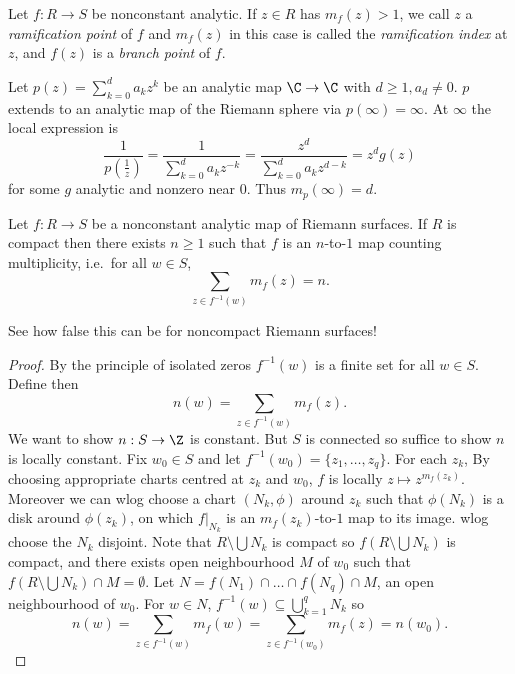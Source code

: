 \documentclass[a4paper]{article}
\begin{document}
\begin{definition}
  Let \(f: R \to S\) be nonconstant analytic. If \(z \in R\) has \(m_f(z) > 1\), we call \(z\) a \emph{ramification point} of \(f\) and \(m_f(z)\) in this case is called the \emph{ramification index} at \(z\), and \(f(z)\) is a \emph{branch point} of \(f\).
\end{definition}

\begin{eg}
  Let \(p(z) = \sum_{k = 0}^d a_kz^k\) be an analytic map \(\C \to \C\) with \(d \geq 1, a_d \neq 0\). \(p\) extends to an analytic map of the Riemann sphere via \(p(\infty) = \infty\). At \(\infty\) the local expression is
  \[
    \frac{1}{p(\frac{1}{z})} = \frac{1}{\sum_{k = 0}^d a_k z^{-k}} = \frac{z^d}{\sum_{k = 0}^d a_k z^{d - k}} = z^d g(z)
  \]
  for some \(g\) analytic and nonzero near \(0\). Thus \(m_p(\infty) = d\).
\end{eg}

\begin{theorem}
  Let \(f: R \to S\) be a nonconstant analytic map of Riemann surfaces. If \(R\) is compact then there exists \(n \geq 1\) such that \(f\) is an \(n\)-to-\(1\) map counting multiplicity, i.e.\ for all \(w \in S\),
  \[
    \sum_{z \in f^{-1}(w)} m_f(z) = n.
  \]
\end{theorem}

See how false this can be for noncompact Riemann surfaces!

\begin{proof}
  By the principle of isolated zeros \(f^{-1}(w)\) is a finite set for all \(w \in S\). Define then
  \[
    n(w) = \sum_{z \in f^{-1}(w)} m_f(z).
  \]
  We want to show \(n: S \to \Z\) is constant. But \(S\) is connected so suffice to show \(n\) is locally constant. Fix \(w_0 \in S\) and let \(f^{-1}(w_0) = \{z_1, \dots, z_q\}\). For each \(z_k\), By choosing appropriate charts centred at \(z_k\) and \(w_0\), \(f\) is locally \(z \mapsto z^{m_f(z_k)}\). Moreover we can wlog choose a chart \((N_k, \phi)\) around \(z_k\) such that \(\phi(N_k)\) is a disk around \(\phi(z_k)\), on which \(f|_{N_k}\) is an \(m_f(z_k)\)-to-\(1\) map to its image. wlog choose the \(N_k\) disjoint. Note that \(R \setminus \bigcup N_k\) is compact so \(f(R \setminus \bigcup N_k)\) is compact, and there exists open neighbourhood \(M\) of \(w_0\) such that \(f(R \setminus \bigcup N_k) \cap M = \emptyset\). Let \(N = f(N_1) \cap \dots \cap f(N_q) \cap M\), an open neighbourhood of \(w_0\). For \(w \in N\), \(f^{-1}(w) \subseteq \bigcup_{k = 1}^q N_k\) so
  \[
    n(w) = \sum_{z \in f^{-1}(w)} m_f(w) = \sum_{z \in f^{-1}(w_0)} m_f(z) = n(w_0).
  \]
\end{proof}
\end{document}
